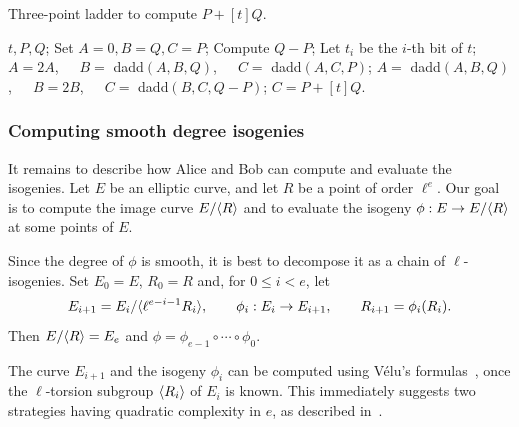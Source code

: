 \begin{algorithm}[t]
  \caption{Three-point ladder to compute $P+[t]Q$.}
  \label{fig:ladder}
  \begin{algorithmic}[1]
    \REQUIRE $t,P,Q$;
    \STATE Set $A=0,B=Q,C=P$;
    \STATE Compute $Q-P$;
    \STATE Let $t_i$ be the $i$-th bit of $t$;
    \STATE $A=2A$,~~~$B=$ dadd$(A,B,Q)$,~~~$C=$ dadd$(A,C,P)$;
    \ELSE
    \STATE $A=$ dadd$(A,B,Q)$,~~~$B=2B$,~~~$C=$ dadd$(B,C,Q-P)$;
    \ENDIF
    \ENDFOR
    \ENSURE $C=P+[t]Q$.
  \end{algorithmic}
\end{algorithm}


\subsubsection{Computing smooth degree isogenies}\label{sssec:isogeny}


It remains to describe how Alice and Bob can compute and evaluate the
isogenies. Let $E$ be an elliptic curve, and let $R$ be a point of
order $\ell^e$. Our goal is to compute the image curve $E/{\langle R \rangle}$ and
to evaluate the isogeny $\phi:E\to E/{\langle R \rangle}$ at some points of $E$.

Since the degree of $\phi$ is smooth, it is best to decompose it as a
chain of $\ell$-isogenies. Set $E_0=E$, $R_0=R$ and, for $0\le i <e$,
let
\begin{equation*}
  E_{i+1} = E_i/{\langle \ell^{e-i-1}R_i \rangle},\qquad
  \phi_i : E_i \to E_{i+1},\qquad
  R_{i+1} = \phi_i(R_i).
\end{equation*}
Then $E/{\langle R \rangle} = E_e$ and $\phi=\phi_{e-1}\circ\cdots\circ\phi_0$.

The curve $E_{i+1}$ and the isogeny $\phi_i$ can be computed using
V\'elu's formulas~\cite{velu71}, once the $\ell$-torsion
subgroup ${\langle R_i \rangle}$ of $E_i$ is known. This immediately suggests two strategies
having quadratic complexity in $e$, as described
in~\cite{jao+defeo2011}.

